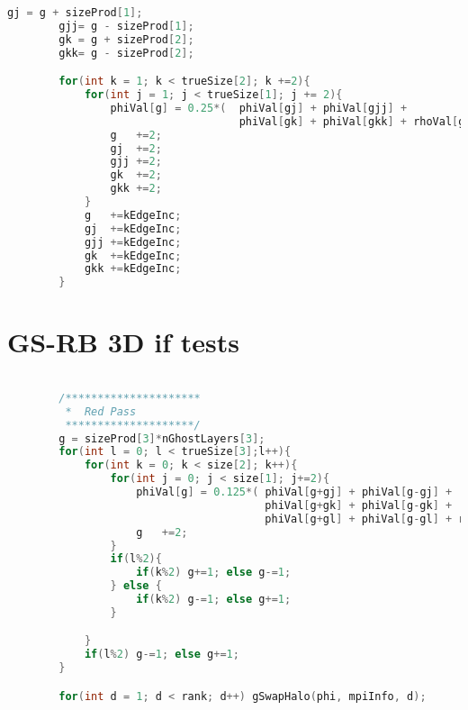 	\begin{lstlisting}[language=c, caption = Loop through grid]
		gj = g + sizeProd[1];
		gjj= g - sizeProd[1];
		gk = g + sizeProd[2];
		gkk= g - sizeProd[2];

		for(int k = 1; k < trueSize[2]; k +=2){
			for(int j = 1; j < trueSize[1]; j += 2){
				phiVal[g] = 0.25*(	phiVal[gj] + phiVal[gjj] +
									phiVal[gk] + phiVal[gkk] + rhoVal[g]);
				g	+=2;
				gj	+=2;
				gjj	+=2;
				gk	+=2;
				gkk	+=2;
			}
			g	+=kEdgeInc;
			gj	+=kEdgeInc;
			gjj	+=kEdgeInc;
			gk	+=kEdgeInc;
			gkk	+=kEdgeInc;
		}
	\end{lstlisting}

	\newpage
	\section{GS-RB 3D if tests}
	\label{sec:GS-RB_if}
	\begin{lstlisting}[language=c, caption = GS-RB with if-tests]

		/*********************
		 *	Red Pass
		 ********************/
		g = sizeProd[3]*nGhostLayers[3];
		for(int l = 0; l < trueSize[3];l++){
			for(int k = 0; k < size[2]; k++){
				for(int j = 0; j < size[1]; j+=2){
					phiVal[g] = 0.125*(	phiVal[g+gj] + phiVal[g-gj] +
										phiVal[g+gk] + phiVal[g-gk] +
										phiVal[g+gl] + phiVal[g-gl] + rhoVal[g]);
					g	+=2;
				}
				if(l%2){
					if(k%2)	g+=1; else g-=1;
				} else {
					if(k%2) g-=1; else g+=1;
				}

			}
			if(l%2) g-=1; else g+=1;
		}

		for(int d = 1; d < rank; d++) gSwapHalo(phi, mpiInfo, d);
	\end{lstlisting}

	\newpage
